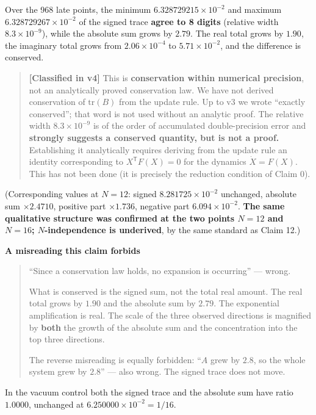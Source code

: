 \documentclass[
  10pt,
]{article}
\begin{document}
Over the 968 late points, the minimum \(6.328729215\times10^{-2}\) and
maximum \(6.328729267\times10^{-2}\) of the signed trace \textbf{agree
to 8 digits} (relative width \(8.3\times10^{-9}\)), while the absolute
sum grows by \(2.79\). The real total grows by \(1.90\), the imaginary
total grows from \(2.06\times10^{-4}\) to \(5.71\times10^{-2}\), and the
difference is conserved.

\begin{quote}
\textbf{{[}Classified in v4{]}} This is \textbf{conservation within
numerical precision}, not an analytically proved conservation law. We
have not derived conservation of \(\mathrm{tr}(B)\) from the update
rule. Up to v3 we wrote ``exactly conserved''; that word is not used
without an analytic proof. The relative width \(8.3\times10^{-9}\) is of
the order of accumulated double-precision error and \textbf{strongly
suggests a conserved quantity, but is not a proof.} Establishing it
analytically requires deriving from the update rule an identity
corresponding to \(X^{\mathsf T}F(X)=0\) for the dynamics
\(\dot X = F(X)\). This has not been done (it is precisely the reduction
condition of Claim 0).
\end{quote}

(Corresponding values at \(N=12\): signed \(8.281725\times10^{-2}\)
unchanged, absolute sum \(\times2.4710\), positive part \(\times1.736\),
negative part \(6.094\times10^{-2}\). \textbf{The same qualitative
structure was confirmed at the two points \(N=12\) and \(N=16\);
\(N\)-independence is underived}, by the same standard as Claim 12.)

\textbf{A misreading this claim forbids}

\begin{quote}
``Since a conservation law holds, no expansion is occurring'' --- wrong.

What is conserved is the signed sum, not the total real amount. The real
total grows by \(1.90\) and the absolute sum by \(2.79\). The
exponential amplification is real. The scale of the three observed
directions is magnified by \textbf{both} the growth of the absolute sum
and the concentration into the top three directions.

The reverse misreading is equally forbidden: ``\(A\) grew by \(2.8\), so
the whole system grew by \(2.8\)'' --- also wrong. The signed trace does
not move.
\end{quote}

In the vacuum control both the signed trace and the absolute sum have
ratio \(1.0000\), unchanged at \(6.250000\times10^{-2} = 1/16\).
\end{document}
